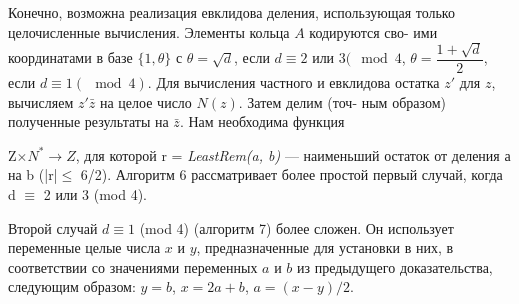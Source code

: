 \documentclass{mai_book}
\begin{document}
\hspace*{15pt}Конечно, возможна реализация евклидова деления, использующая\linebreak
только целочисленные вычисления. Элементы кольца $A$ кодируются сво-\linebreak
ими координатами в базе $\{1,\theta\}$ с $\theta=\sqrt{d}$, если $d\equiv2$ или $3 (\mod{4}$,\linebreak
$\theta=\dfrac{1+\sqrt{d}}{2}$, если $d\equiv1 (\mod{4})$. Для вычисления частного и евклидова\linebreak
остатка $z'$ для $z$, вычисляем $z'\bar{z}$ на целое число $N(z)$. Затем делим (точ-\linebreak
ным образом) полученные результаты на $\bar{z}$. Нам необходима функция\linebreak

\pagebreak
%
%
 Z$\times N^{\ast} \longrightarrow Z$,  для которой r = {\it LeastRem(a, b)} — наименьший\linebreak
остаток от деления а на b (|r|$\leqslant$ 6/2). Алгоритм 6 рассматривает более\linebreak
простой первый случай, когда d $\equiv$ 2 или 3 (mod 4).

Второй случай $d\equiv1$ (mod 4) (алгоритм 7) более сложен. Он использует\linebreak
переменные целые числа $x$ и $y$, предназначенные для установки в них,\linebreak
в соответствии со значениями переменных $a$ и $b$ из предыдущего\linebreak
доказательства, следующим образом: $y=b$, $x=2a+b$, $a=(x-y)/2$.

\def\MYdef{\mathrel{\stackrel{\rm def}=}}
\end{document}
